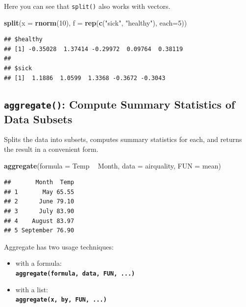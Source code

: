 \documentclass[]{book}
\newenvironment{Shaded}{\begin{snugshade}}{\end{snugshade}}
\newcommand{\DataTypeTok}[1]{\textcolor[rgb]{0.13,0.29,0.53}{#1}}
\newcommand{\DecValTok}[1]{\textcolor[rgb]{0.00,0.00,0.81}{#1}}
\newcommand{\KeywordTok}[1]{\textcolor[rgb]{0.13,0.29,0.53}{\textbf{#1}}}
\newcommand{\NormalTok}[1]{#1}
\newcommand{\OperatorTok}[1]{\textcolor[rgb]{0.81,0.36,0.00}{\textbf{#1}}}
\newcommand{\StringTok}[1]{\textcolor[rgb]{0.31,0.60,0.02}{#1}}
\begin{document}
Here you can see that \texttt{split()} also works with vectors.

\begin{Shaded}
\begin{Highlighting}[]
\KeywordTok{split}\NormalTok{(}\DataTypeTok{x =} \KeywordTok{rnorm}\NormalTok{(}\DecValTok{10}\NormalTok{), }\DataTypeTok{f =} \KeywordTok{rep}\NormalTok{(}\KeywordTok{c}\NormalTok{(}\StringTok{"sick"}\NormalTok{, }\StringTok{"healthy"}\NormalTok{), }\DataTypeTok{each=}\DecValTok{5}\NormalTok{))}
\end{Highlighting}
\end{Shaded}

\begin{verbatim}
## $healthy
## [1] -0.35028  1.37414 -0.29972  0.09764  0.38119
## 
## $sick
## [1]  1.1886  1.0599  1.3368 -0.3672 -0.3043
\end{verbatim}

\hypertarget{aggregate-compute-summary-statistics-of-data-subsets}{%
\subsection{\texorpdfstring{\texttt{aggregate()}: Compute Summary Statistics of Data Subsets}{aggregate(): Compute Summary Statistics of Data Subsets}}\label{aggregate-compute-summary-statistics-of-data-subsets}}

Splits the data into subsets, computes summary statistics for each, and returns the result in a convenient form.

\begin{Shaded}
\begin{Highlighting}[]
\KeywordTok{aggregate}\NormalTok{(}\DataTypeTok{formula =}\NormalTok{ Temp }\OperatorTok{~}\StringTok{ }\NormalTok{Month, }\DataTypeTok{data =}\NormalTok{ airquality, }\DataTypeTok{FUN =}\NormalTok{ mean)}
\end{Highlighting}
\end{Shaded}

\begin{verbatim}
##       Month  Temp
## 1       May 65.55
## 2      June 79.10
## 3      July 83.90
## 4    August 83.97
## 5 September 76.90
\end{verbatim}

Aggregate has two usage techniques:

\begin{itemize}
\item
  with a formula:\\
  \textbf{\texttt{aggregate(formula,\ data,\ FUN,\ ...)}}
\item
  with a list:\\
  \textbf{\texttt{aggregate(x,\ by,\ FUN,\ ...)}}
\end{itemize}
\end{document}
